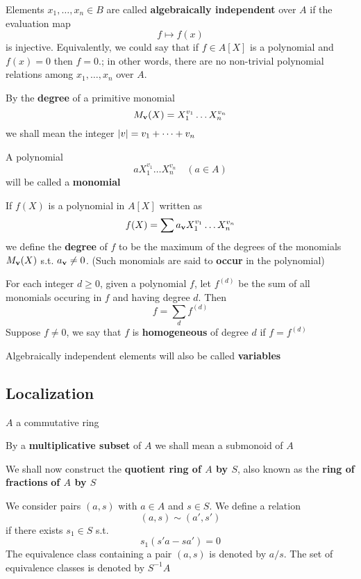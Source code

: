 \documentclass[11pt]{article}
\begin{document}
Elements \(x_1,\dots,x_n\in B\) are called \textbf{algebraically independent} over \(A\) if the evaluation map
\begin{equation*}
f\mapsto f(x)
\end{equation*}
is injective. Equivalently, we could say that if \(f\in A[X]\) is a polynomial and \(f(x)=0\)
then \(f=0\).; in other words, there are no non-trivial polynomial relations among \(x_1,\dots,x_n\)
over \(A\).

By the \textbf{degree} of a primitive monomial
\begin{equation*}
M_{\operatorname{\textbf{v}}}(X)=X_1^{v_1}\dots X_n^{v_n}
\end{equation*}
we shall mean the integer \(\abs{v}=v_1+\dots+v_n\)

A polynomial
\begin{equation*}
aX_1^{v_1}\dots X_n^{v_n}\quad(a\in A)
\end{equation*}
will be called a \textbf{monomial}

If \(f(X)\) is a polynomial in \(A[X]\) written as
\begin{equation*}
f(X)=\sum a_{\operatorname{\textbf{v}}}X_1^{v_1}\dots X_n^{v_n}
\end{equation*}
we define the \textbf{degree} of \(f\) to be the maximum of the degrees of the monomials \(M_{\operatorname{\textbf{v}}}(X)\)
s.t. \(a_{\operatorname{\textbf{v}}}\neq 0\). (Such monomials are said to \textbf{occur} in the polynomial)

For each integer \(d\ge 0\), given a polynomial \(f\), let \(f^{(d)}\) be the sum of all monomials
occuring in \(f\) and having degree \(d\). Then
\begin{equation*}
f=\sum_df^{(d)}
\end{equation*}
Suppose \(f\neq 0\), we say that \(f\) is \textbf{homogeneous} of degree \(d\) if \(f=f^{(d)}\)

Algebraically independent elements will also be called \textbf{variables}

\subsection{Localization}
\label{sec:orgba17010}
\(A\) a commutative ring

By a \textbf{multiplicative subset} of \(A\) we shall mean a submonoid of \(A\)

We shall now construct the \textbf{quotient ring of \(A\) by \(S\)}, also known as the \textbf{ring of fractions}
\textbf{of \(A\) by \(S\)}

We consider pairs \((a,s)\) with \(a\in A\) and \(s\in S\). We define a relation
\begin{equation*}
(a,s)\sim (a',s')
\end{equation*}
if there exists \(s_1\in S\) s.t.
\begin{equation*}
s_1(s'a-sa')=0
\end{equation*}
The equivalence class containing a pair \((a,s)\) is denoted by \(a/s\). The set of equivalence
classes is denoted by \(S^{-1}A\)
\end{document}
